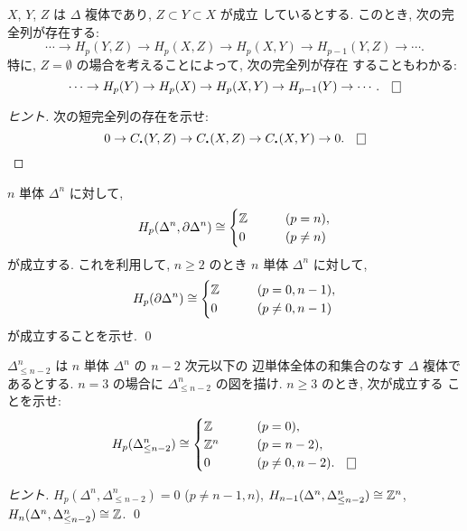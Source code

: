 \documentclass[12pt,twoside]{jarticle}
\begin{document}
\begin{question}[相対ホモロジー群の長完全列]\qstar{*}
  $X$, $Y$, $Z$ は $\Delta$ 複体であり, $Z \subset Y \subset X$ が成立
  しているとする. このとき, 次の完全列が存在する:
  \[
    \cdots \to
    H_p(Y,Z) \to
    H_p(X,Z) \to
    H_p(X,Y)  \to
    H_{p-1}(Y,Z) \to
    \cdots.
  \]
  特に, $Z = \emptyset$ の場合を考えることによって, 次の完全列が存在
  することもわかる:
  \[
    \cdots \to
    H_p(Y) \to
    H_p(X) \to
    H_p(X,Y) \to
    H_{p-1}(Y) \to
    \cdots.
   \qed
  \]
\end{question}

\begin{proof}[ヒント]
 次の短完全列の存在を示せ:
 \[
  0 \to
  C_\bcdot(Y,Z) \to
  C_\bcdot(X,Z) \to
  C_\bcdot(X,Y) \to
  0.
  \qed
 \]
\end{proof}

\begin{question}
  $n$ 単体 $\Delta^n$ に対して,
  \[
    H_p(\Delta^n, \partial\Delta^n) \cong
    \begin{cases}
      {\mathbb Z} & \qquad (p = n), \\
      0  & \qquad (p \ne n)
    \end{cases}
  \]
  が成立する. 
  これを利用して, $n\ge2$ のとき $n$ 単体 $\Delta^n$ に対して, 
  \[
    H_p(\partial\Delta^n) \cong
    \begin{cases}
      {\mathbb Z} & \qquad (p = 0,n-1), \\
      0  & \qquad (p \ne 0,n-1)
    \end{cases}
  \]
  が成立することを示せ.  \qed
\end{question}

\begin{question}
 \label{q:Delta(n,n-2)}
 $\Delta^n_{\le n-2}$ は $n$ 単体 $\Delta^n$ の $n-2$ 次元以下の
 辺単体全体の和集合のなす $\Delta$ 複体であるとする.  
 $n = 3$ の場合に $\Delta^n_{\le n-2}$ の図を描け. 
 $n\ge 3$ のとき, 次が成立する
 ことを示せ:
 \[
  H_p(\Delta^n_{\le n-2}) \isom
  \begin{cases}
    \Z   & \qquad (p = 0), \\
    \Z^n & \qquad (p = n-2), \\
    0    & \qquad (p \ne 0,n-2). \qed
  \end{cases}
 \]
\end{question}

\begin{proof}[ヒント]
$H_p(\Delta^n,\Delta^n_{\le n-2})=0$ ($p\ne n-1, n$), %
$H_{n-1}(\Delta^n,\Delta^n_{\le n-2}) \cong {\mathbb Z}^n$, %
$H_n(\Delta^n,\Delta^n_{\le n-2}) \cong {\mathbb Z}$. \qed
\end{proof}
\end{document}
